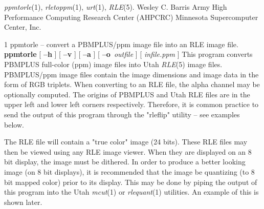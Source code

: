 {\it ppmtorle}{\rm (1),}
{\it rletoppm}{\rm (1),}
{\it urt}{\rm (1),}
{\it RLE}{\rm (5).}
\nwl
Wesley C. Barris
\nwl
Army High Performance Computing Research Center (AHPCRC)
\nwl
Minnesota Supercomputer Center, Inc.
\newpage


%
%
%
 1
ppmtorle -- convert a PBMPLUS/ppm image file into an RLE image file.
{\bf ppmtorle}
[
{\bf --h}
] [
{\bf --v}
] [
{\bf --a}
] [
{\bf --o}{\it \ outfile}
] [
{\it infile.ppm}
]
This program converts PBMPLUS full-color (ppm) image files into Utah
{\it RLE}{\rm (5)}
image files.  PBMPLUS/ppm image files contain the image dimensions and image
data in the form of RGB triplets.  When converting to an RLE file, the alpha
channel may be optionally computed.  The origins of PBMPLUS and Utah RLE files
are  in the upper left and lower left corners respectively.  Therefore, it is
common practice to send the output of this program through the "rleflip"
utility -- see examples below.
\par
The RLE file will contain a "true color" image
(24 bits).  These RLE files may then be viewed using any RLE image viewer.  When
they are displayed on an 8 bit display, the image must be dithered.  In order
to produce a better looking image (on 8 bit displays), it is recommended that
the image be quantizing (to 8 bit mapped color) prior to its display.  This may
be done by piping the output of this program into the Utah
{\it mcut}{\rm (1)}
or
{\it rlequant}{\rm (1)}
utilities.
An example of this is shown later.
\par
{}
